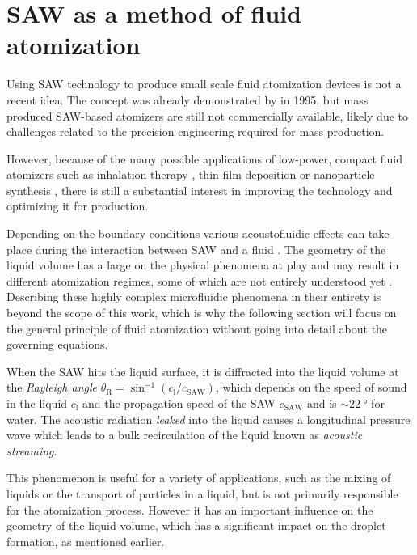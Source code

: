 \section{SAW as a method of fluid atomization}
\label{sec:saw_vapour}

Using SAW technology to produce small scale fluid atomization devices is not a recent idea. 
The concept was already demonstrated by \cite{kurosawaSurfaceAcousticWave1995} in 1995, but mass produced SAW-based atomizers are still not commercially available, likely due to challenges related to the precision engineering required for mass production.

However, because of the many possible applications of low-power, compact fluid atomizers such as inhalation therapy \cite{qiMiniatureInhalationTherapy2009a}, thin film deposition \cite{murochiDepositionThinFilm2007} or nanoparticle synthesis \cite{alvarezRapidGenerationProtein2008}, there is still a substantial interest in improving the technology and optimizing it for production.

Depending on the boundary conditions various acoustofluidic effects can take place during the interaction between SAW and a fluid \cite{winklerSAWbasedFluidAtomization2015a}.
The geometry of the liquid volume has a large on the physical phenomena at play and may result in different atomization regimes, some of which are not entirely understood yet \cite{collinsAtomizationThinWater2012,huangExperimentalResearchSurface2022}.
Describing these highly complex microfluidic phenomena in their entirety is beyond the scope of this work, which is why the following section will focus on the general principle of fluid atomization without going into detail about the governing equations.

When the SAW hits the liquid surface, it is diffracted into the liquid volume at the \emph{Rayleigh angle} $\theta_\text{R} = \sin^{-1}(c_\text{l}/c_\text{SAW})$, which depends on the speed of sound in the liquid $c_\text{l}$ and the propagation speed of the SAW $c_\text{SAW}$ and is $\sim\SI{22}{\degree}$ for water.
The acoustic radiation \emph{leaked} into the liquid causes a longitudinal pressure wave which leads to a bulk recirculation of the liquid known as \emph{acoustic streaming}.

This phenomenon is useful for a variety of applications, such as the mixing of liquids or the transport of particles in a liquid, but is not primarily responsible for the atomization process.
However it has an important influence on the geometry of the liquid volume, which has a significant impact on the droplet formation, as mentioned earlier.

